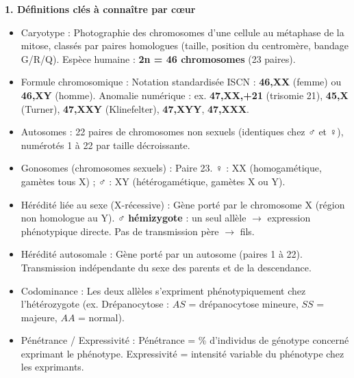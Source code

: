\documentclass[11pt]{article}
\newcommand{\cle}[1]{{\popxbold\color{popdark}#1}}
\newcounter{popsec}
\newcounter{popsub}
\newcommand{\courssub}[1]{%
  \stepcounter{popsub}%
  \par\vspace{9pt}\noindent{\popxbold\fontsize{11.5}{13}\selectfont\color{popink}{\color{poporange}\thepopsec.\thepopsub}\hspace{6pt}#1}\par\nopagebreak\vspace{4pt}
}
\begin{document}
\courssub{Bilan synthétique}

\begin{bilan}

\textbf{1. Définitions clés à connaître par cœur}
\begin{itemize}
  \item \cle{Caryotype} : Photographie des chromosomes d'une cellule au métaphase de la mitose, classés par paires homologues (taille, position du centromère, bandage G/R/Q). Espèce humaine : \textbf{2n = 46 chromosomes} (23 paires).
  \item \cle{Formule chromosomique} : Notation standardisée ISCN : \textbf{46,XX} (femme) ou \textbf{46,XY} (homme). Anomalie numérique : ex. \textbf{47,XX,+21} (trisomie 21), \textbf{45,X} (Turner), \textbf{47,XXY} (Klinefelter), \textbf{47,XYY}, \textbf{47,XXX}.
  \item \cle{Autosomes} : 22 paires de chromosomes non sexuels (identiques chez ♂ et ♀), numérotés 1 à 22 par taille décroissante.
  \item \cle{Gonosomes (chromosomes sexuels)} : Paire 23. ♀ : XX (homogamétique, gamètes tous X) ; ♂ : XY (hétérogamétique, gamètes X ou Y).
  \item \cle{Hérédité liée au sexe (X-récessive)} : Gène porté par le chromosome X (région non homologue au Y). ♂ \textbf{hémizygote} : un seul allèle $\rightarrow$ expression phénotypique directe. Pas de transmission père $\to$ fils.
  \item \cle{Hérédité autosomale} : Gène porté par un autosome (paires 1 à 22). Transmission indépendante du sexe des parents et de la descendance.
  \item \cle{Codominance} : Les deux allèles s'expriment phénotypiquement chez l'hétérozygote (ex. Drépanocytose : $AS$ = drépanocytose mineure, $SS$ = majeure, $AA$ = normal).
  \item \cle{Pénétrance / Expressivité} : Pénétrance = \% d'individus de génotype concerné exprimant le phénotype. Expressivité = intensité variable du phénotype chez les exprimants.
\end{itemize}


\end{bilan}
\end{document}
